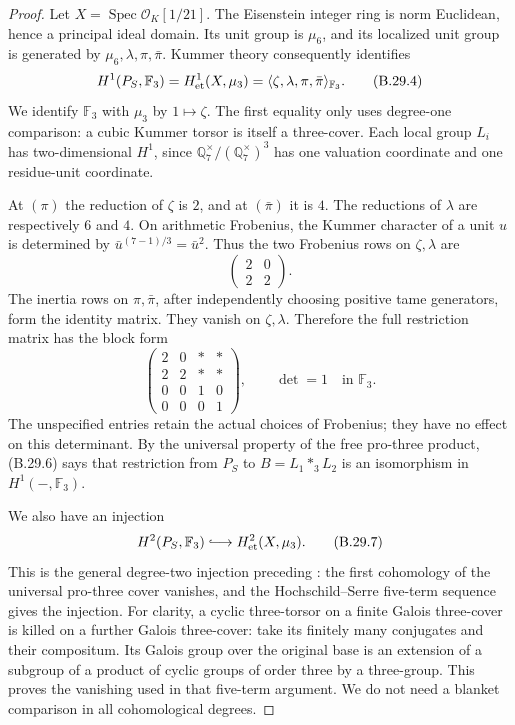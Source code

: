 \begin{proof}
Let $X=\operatorname{Spec}\mathcal O_K[1/21]$.
The Eisenstein integer ring is norm Euclidean, hence a principal
ideal domain.  Its unit group is $\mu_6$, and its localized unit
group is generated by $\mu_6,\lambda,\pi,\bar\pi$.
Kummer theory consequently identifies
\[
 H^1(P_S,\mathbb F_3)
   =H^1_{\rm et}(X,\mu_3)
   =\langle\zeta,\lambda,\pi,\bar\pi\rangle_{\mathbb F_3}.
                                                               \tag{B.29.4}
\]
We identify $\mathbb F_3$ with $\mu_3$ by $1\mapsto\zeta$.
The first equality only uses degree-one comparison: a cubic
Kummer torsor is itself a three-cover.  Each local group $L_i$
has two-dimensional $H^1$, since
$\mathbb Q_7^\times/(\mathbb Q_7^\times)^3$ has one valuation
coordinate and one residue-unit coordinate.

At $(\pi)$ the reduction of $\zeta$ is $2$, and at $(\bar\pi)$
it is $4$.  The reductions of $\lambda$ are respectively $6$
and $4$.  On arithmetic Frobenius, the Kummer character of a
unit $u$ is determined by $\bar u^{(7-1)/3}=\bar u^2$.
Thus the two Frobenius rows on $\zeta,\lambda$ are
\[
                   \begin{pmatrix}2&0\\2&2\end{pmatrix}.
                                                               \tag{B.29.5}
\]
The inertia rows on $\pi,\bar\pi$, after independently choosing
positive tame generators, form the identity matrix.  They vanish
on $\zeta,\lambda$.  Therefore the full restriction matrix has
the block form
\[
 \begin{pmatrix}
 2&0&*&*\\2&2&*&*\\0&0&1&0\\0&0&0&1
 \end{pmatrix},\qquad \det=1\quad\text{in }\mathbb F_3.          \tag{B.29.6}
\]
The unspecified entries retain the actual choices of Frobenius;
they have no effect on this determinant.  By the universal
property of the free pro-three product, (B.29.6) says that
restriction from $P_S$ to $B=L_1*_3L_2$ is an isomorphism in
$H^1(-,\mathbb F_3)$.

We also have an injection
\[
 H^2(P_S,\mathbb F_3)\lhook\joinrel\longrightarrow
 H^2_{\rm et}(X,\mu_3).                                      \tag{B.29.7}
\]
This is the general degree-two injection preceding
\citet[Proposition 2.1, author version p.~4]{CBSchmidt2007}:
the first cohomology of the universal pro-three cover vanishes,
and the Hochschild--Serre five-term sequence gives the injection.
For clarity, a cyclic three-torsor on a finite Galois three-cover
is killed on a further Galois three-cover: take its finitely
many conjugates and their compositum.  Its Galois group over
the original base is an extension of a subgroup of a product
of cyclic groups of order three by a three-group.  This proves
the vanishing used in that five-term argument.  We do not need
a blanket comparison in all cohomological degrees.


\end{proof}
